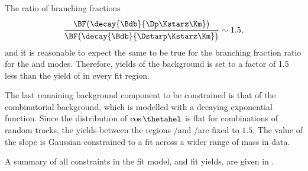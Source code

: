 The ratio of branching fractions
\begin{equation}
  \frac{\BF\big(\decay{\Bdb}{\Dp\Kstarz\Km}\big)}
  {\BF\big(\decay{\Bdb}{\Dstarp\Kstarz\Km}\big)}
  \sim 1.5,
\end{equation}
and it is reasonable to expect the same to be true for the branching fraction ratio for the
\bstodskstrk and \bstodsstrkstrk modes.
Therefore, yields of the \bstodsstrkstrk background is set to a factor of 1.5 less than the yield
of \bstodskstrk in every fit region.




The last remaining background component to be constrained is that of the combinatorial background,
which is modelled with a decaying exponential function.
Since the distribution of $\cos\thetahel$ is flat for combinations of random tracks, the yields
between the regions \rA/\rC and \rB/\rD  are fixed to $1.5$.
The value of the slope is Gaussian constrained to a fit across a wider range of mass in data.

A summary of all constraints in the fit model, and fit yields, are given in
.

